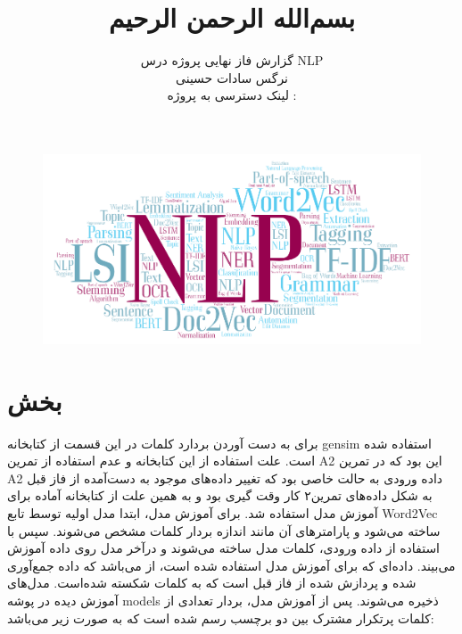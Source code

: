 \documentclass[a4paper]{article}
\begin{document}
 \begin{figure}
 \centering
 \includegraphics[scale = 0.4]{nlp.png}
 \end{figure}

\title{بسم‌الله الرحمن الرحیم}
\author{گزارش فاز نهایی پروژه درس NLP
\\
نرگس سادات حسینی
\\
لینک دسترسی به پروژه : }
\maketitle
\newpage


\tableofcontents

 
\newpage
\section{بخش }
برای به دست آوردن بردارد کلمات در این قسمت از کتابخانه gensim استفاده شده است. علت استفاده از این کتابخانه و عدم استفاده از تمرین A2 این بود که در تمرین A2 داده ورودی به حالت خاصی بود که تغییر داده‌های موجود به دست‌آمده از فاز قبل به شکل داده‌های تمرین۲ کار وقت ‌گیری بود و به همین علت از کتابخانه آماده برای آموزش مدل استفاده شد.
\newline
برای آموزش مدل، ابتدا مدل اولیه توسط تابع Word2Vec ساخته می‌شود و پارامترهای آن مانند اندازه بردار کلمات مشخص می‌شوند. سپس با استفاده از داده ورودی، کلمات مدل ساخته می‌شوند و درآخر مدل روی داده آموزش می‌بیند. داده‌ای که برای آموزش مدل استفاده شده است، از  می‌باشد که داده جمع‌آوری شده و پردازش شده از فاز قبل است که به کلمات شکسته شده‌است. مدل‌های آموزش دیده در پوشه models ذخیره می‌شوند.
\newline
پس از آموزش مدل، بردار تعدادی از کلمات پرتکرار مشترک بین دو برچسب رسم شده است که به صورت زیر می‌باشد:
\newline
‎\graphicspath{{../reports}}‎
\end{document}
